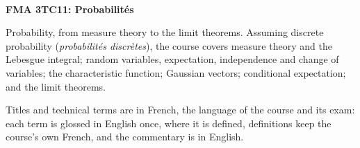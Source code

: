 \documentclass[10pt]{article}
\begin{document}
\thispagestyle{empty}
\bigskip \
\vspace{0.1cm}

\begin{center}
{\fontsize{30}{30} \selectfont \bf \sffamily FMA 3TC11: Probabilités }\\
\vspace{24pt}
\end{center}

{\parindent0pt \baselineskip=15.5pt
  Probability, from measure theory to the limit theorems. Assuming discrete probability
  (\textit{probabilités discrètes}), the course covers measure theory and the
  Lebesgue integral; random variables, expectation, independence and change of
  variables; the characteristic function; Gaussian vectors; conditional expectation;
  and the limit theorems.

  \medskip
  Titles and technical terms are in French, the language of the course and its exam:
  each term is glossed in English once, where it is defined, definitions keep the
  course's own French, and the commentary is in English.
}

\microtoc%
\newpage










\end{document}
